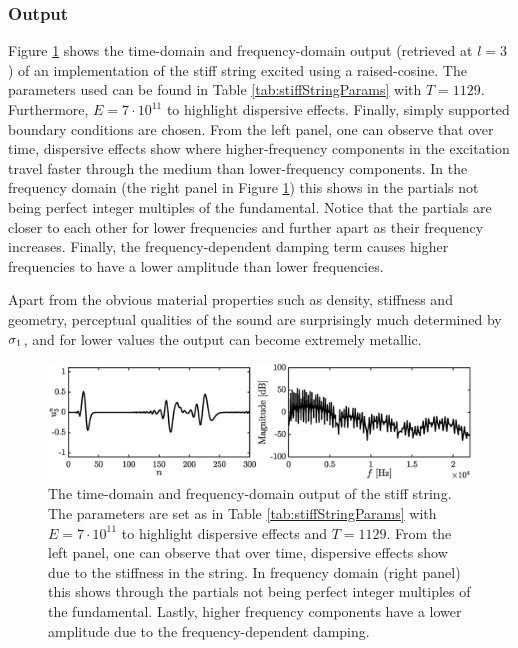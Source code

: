 {\renewcommand{\arraystretch}{1}


\subsubsection{Output}
Figure \ref{fig:stiffStringOutput} shows the time-domain and frequency-domain output (retrieved at $l = 3$) of an implementation of the stiff string excited using a raised-cosine. The parameters used can be found in Table \ref{tab:stiffStringParams} 
with $T = 1129$. Furthermore, $E = 7\cdot 10^{11}$ to highlight dispersive effects. Finally, simply supported boundary conditions are chosen. From the left panel, one can observe that over time, dispersive effects show where higher-frequency components in the excitation travel faster through the medium than lower-frequency components. In the frequency domain (the right panel in Figure \ref{fig:stiffStringOutput}) this shows in the partials not being perfect integer multiples of the fundamental. Notice that the partials are closer to each other for lower frequencies and further apart as their frequency increases. Finally, the frequency-dependent damping term causes higher frequencies to have a lower amplitude than lower frequencies. 

Apart from the obvious material properties such as density, stiffness and geometry, perceptual qualities of the sound are surprisingly much determined by $\sigma_{1}$, and for lower values the output can become extremely metallic.

\begin{figure}[h]
    \includegraphics[width=\textwidth]{figures/resonators/outputFFT.eps}
    \caption{The time-domain and frequency-domain output of the stiff string. The parameters are set as in Table \ref{tab:stiffStringParams} with $E = 7\cdot 10^{11}$ to highlight dispersive effects and $T = 1129$. From the left panel, one can observe that over time, dispersive effects show due to the stiffness in the string. In frequency domain (right panel) this shows through the partials not being perfect integer multiples of the fundamental. Lastly, higher frequency components have a lower amplitude due to the frequency-dependent damping.\label{fig:stiffStringOutput}}
\end{figure}


}
